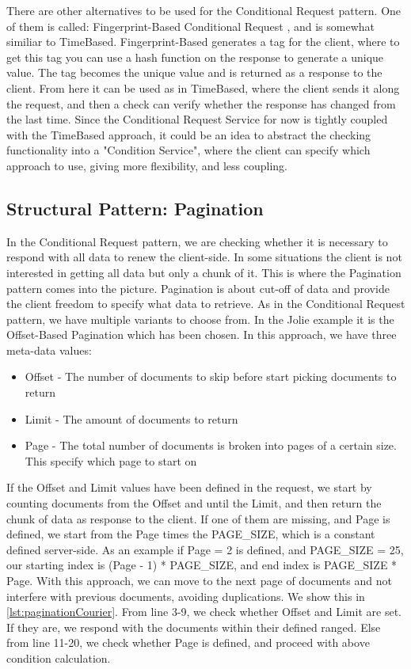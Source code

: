 \documentclass[12pt]{article}
\begin{document}
There are other alternatives to be used for the Conditional Request pattern. One of them is called: Fingerprint-Based Conditional Request \cite{CondReqRFC:1}, and is somewhat similiar to TimeBased. Fingerprint-Based generates a tag for the client, where to get this tag you can use a hash function on the response to generate a unique value. The tag becomes the unique value and is returned as a response to the client. From here it can be used as in TimeBased, where the client sends it along the request, and then a check can verify whether the response has changed from the last time. Since the Conditional Request Service for now is tightly coupled with the TimeBased approach, it could be an idea to abstract the checking functionality into a "Condition Service", where the client can specify which approach to use, giving more flexibility, and less coupling.\\

\subsection{Structural Pattern: Pagination}
In the Conditional Request pattern, we are checking whether it is necessary to respond with all data to renew the client-side. In some situations the client is not interested in getting all data but only a chunk of it. This is where the Pagination pattern \cite{PaginationMAPI:1} comes into the picture. Pagination is about cut-off of data and provide the client freedom to specify what data to retrieve. As in the Conditional Request pattern, we have multiple variants to choose from. In the Jolie example it is the Offset-Based Pagination which has been chosen. In this approach, we have three meta-data values: 

\begin{itemize}
    \item Offset - The number of documents to skip before start picking documents to return
    \item Limit - The amount of documents to return
    \item Page - The total number of documents is broken into pages of a certain size. This specify which page to start on
\end{itemize}

If the Offset and Limit values have been defined in the request, we start by counting documents from the Offset and until the Limit, and then return the chunk of data as response to the client. If one of them are missing, and Page is defined, we start from the Page times the PAGE_SIZE, which is a constant defined server-side. As an example if Page = 2 is defined, and PAGE_SIZE = 25, our starting index is (Page - 1) * PAGE_SIZE, and end index is PAGE_SIZE * Page. With this approach, we can move to the next page of documents and not interfere with previous documents, avoiding duplications. We show this in \ref{lst:paginationCourier}. From line 3-9, we check whether Offset and Limit are set. If they are, we respond with the documents within their defined ranged. Else from line 11-20, we check whether Page is defined, and proceed with above condition calculation.
\end{document}
